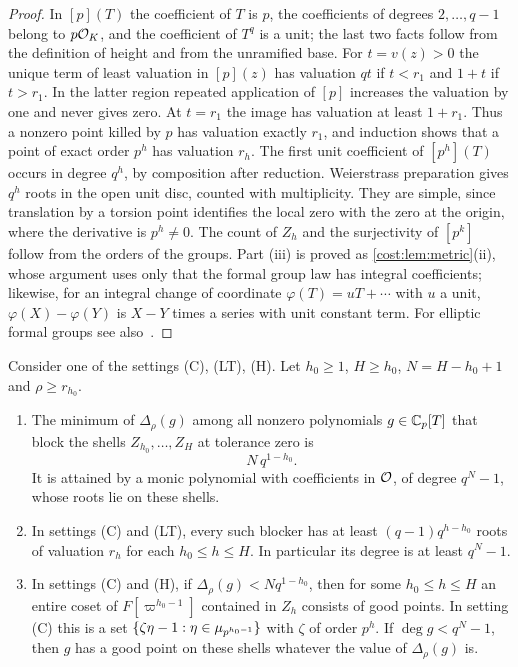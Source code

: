 \begin{proof}
In $[p](T)$ the coefficient of $T$ is $p$, the coefficients of degrees $2,\ldots,q-1$ belong
to $p\mathcal{O}_K$, and the coefficient of $T^q$ is a unit; the last two facts follow from the
definition of height and from the unramified base. For $t=v(z)>0$ the unique term of least
valuation in $[p](z)$ has valuation $qt$ if $t<r_1$ and $1+t$ if $t>r_1$. In the latter
region repeated application of $[p]$ increases the valuation by one and never gives zero. At
$t=r_1$ the image has valuation at least $1+r_1$. Thus a nonzero point killed by $p$ has
valuation exactly $r_1$, and induction shows that a point of exact order $p^h$ has valuation
$r_h$. The first unit coefficient of $[p^h](T)$ occurs in degree $q^h$, by composition after
reduction. Weierstrass preparation gives $q^h$ roots in the open unit disc, counted with
multiplicity. They are simple, since translation by a torsion point identifies the local
zero with the zero at the origin, where the derivative is $p^h\ne0$. The count of $Z_h$ and
the surjectivity of $[p^k]$ follow from the orders of the groups. Part (iii) is proved as
\cref{cost:lem:metric}(ii), whose argument uses only that the formal group law has integral
coefficients; likewise, for an integral change of coordinate $\varphi(T)=uT+\cdots$ with
$u$ a unit, $\varphi(X)-\varphi(Y)$ is $X-Y$ times a series with unit constant term. For
elliptic formal groups
see also~\cite[\S4, Lemma~4.1]{BoxallGrantSingular}.
\end{proof}

\begin{theorem}\label{cost:thm:minimax}
Consider one of the settings \textup{(C)}, \textup{(LT)}, \textup{(H)}. Let $h_0\ge1$,
$H\ge h_0$, $N=H-h_0+1$ and $\rho\ge r_{h_0}$.
\begin{enumerate}[label=\textup{(\roman*)}]
\item The minimum of $\Delta_\rho(g)$ among all nonzero polynomials $g\in\mathbb{C}_p[T]$ that block
the shells $Z_{h_0},\ldots,Z_H$ at tolerance zero is
\[
 N\,q^{1-h_0}.
\]
It is attained by a monic polynomial with coefficients in $\mathcal{O}$, of degree $q^N-1$, whose
roots lie on these shells.
\item In settings \textup{(C)} and \textup{(LT)}, every such blocker has at least
$(q-1)q^{h-h_0}$ roots of valuation $r_h$ for each $h_0\le h\le H$. In particular its degree
is at least $q^N-1$.
\item In settings \textup{(C)} and \textup{(H)}, if $\Delta_\rho(g)<Nq^{1-h_0}$, then for
some $h_0\le h\le H$ an entire coset of $F[\varpi^{h_0-1}]$ contained in $Z_h$ consists of
good points. In setting \textup{(C)} this is a set
$\{\zeta\eta-1:\eta\in\mu_{p^{h_0-1}}\}$ with $\zeta$ of order $p^h$. If $\deg g<q^N-1$,
then $g$ has a good point on these shells whatever the value of $\Delta_\rho(g)$ is.
\end{enumerate}
\end{theorem}

